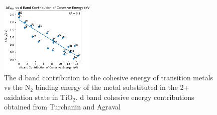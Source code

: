 \begin{figure}
    \centering
    \includegraphics[width=0.4\textwidth]{Images/cohesive_eng_vs_NH2.pdf}
    
    \caption{The d band contribution to the cohesive energy of transition metals vs the N$_2$ binding energy of the metal substituted in the 2+ oxidation state in TiO$_2$. d band cohesive energy contributions obtained from Turchanin and Agraval\cite{Turchanin_2008}}
    \label{fig:N2_cohesive}
\end{figure}







